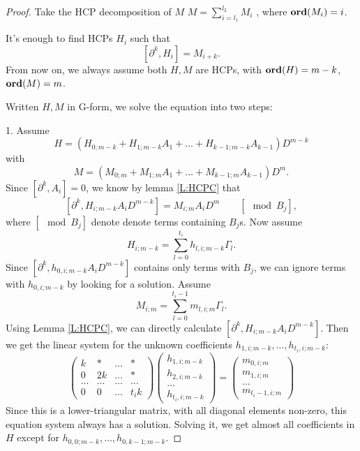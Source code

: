 \documentclass[11pt]{article}
\theoremstyle{definition}
\newcommand{\Ord}{\mathop {\rm \bf ord}}
\theoremstyle{plain}
\numberwithin{equation}{section}
\begin{document}
\begin{proof}
	Take the HCP decomposition of $M$ $M=\sum_{i=l_1}^{l_2}M_i$ , where $\Ord(M_i)=i$. 
	
It's enough to find HCPs $H_i$ such that 
	$$
	[\partial^k,H_i]=M_{i+k}.
	$$
	From now on, we always assume both $H,M$ are HCPs, with $\Ord(H)=m-k$, $\Ord(M)=m$.
	
	Written $H,M$ in G-form, we solve the equation into two steps:
	
		1. Assume 
		$$
		H=(H_{0;m-k}+H_{1;m-k}A_1+\dots+H_{k-1;m-k}A_{k-1})D^{m-k}
		$$
		with 
		$$
		M=(M_{0;m}+M_{1;m}A_1+\dots+M_{k-1;m}A_{k-1})D^m.
		$$
Since $[\partial^k, A_i]=0$, we know by lemma \ref{L:HCPC}  that 
		\begin{equation}
		\label{E:(*)}
		[\partial^k,H_{i;m-k}A_i D^{m-k}]=M_{i;m}A_iD^m \qquad [\mod B_j],
		\end{equation}
	where $[\mod B_j]$ denote denote terms containing $B_j$s. 
		Now assume 
		$$
		H_{i;m-k}=\sum_{l=0}^{t_i}h_{l,i;m-k}\Gamma_l.
		$$
		Since $[\partial^k,h_{0,i;m-k}A_iD^{m-k}]$ contains only terms with $B_j$,  we can ignore terms with $h_{0,i;m-k}$ by looking for a solution. Assume 
		$$
		M_{i;m}=\sum_{l=0}^{t_i-1}m_{l,i;m}\Gamma_l. 
		$$
		Using  Lemma \ref{L:HCPC}, we can directly calculate $[\partial^k,H_{i;m-k}A_i D^{m-k}]$. Then we get the linear system for the unknown coefficients ${h_{1,i;m-k},\dots,h_{t_i,i;m-k}}$:
		\begin{equation}
		\label{E:matrix_equation}
		\begin{pmatrix}
			 k & * & \dots & * \\
			0 & 2 k & \dots & * \\
			\dots & \dots & \dots & \dots \\
			0 & 0 & \dots & t_i k
		\end{pmatrix}\begin{pmatrix}
		h_{1,i;m-k} \\
		h_{2,i;m-k} \\
		\dots \\
		h_{t_i,i;m-k}
		\end{pmatrix}=\begin{pmatrix}
		m_{0,i;m} \\
		m_{1,i;m} \\
		\dots \\
		m_{t_i-1,i;m}
		\end{pmatrix}
		\end{equation}
		Since  this is a lower-triangular matrix, with all diagonal elements non-zero, this equation system always has  a solution. Solving it, we get almost all coefficients in $H$ except for $h_{0,0;m-k},\dots,h_{0,k-1;m-k}$.
		

\end{proof}
\end{document}
